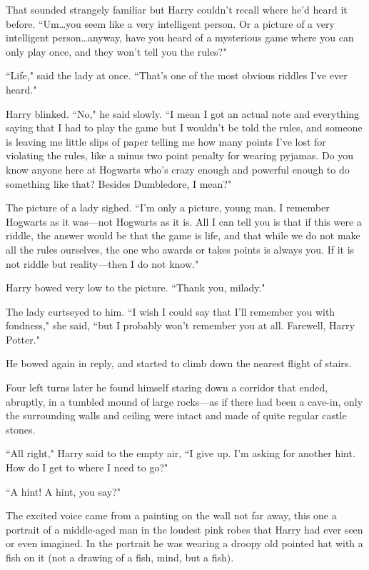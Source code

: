 That sounded strangely familiar but Harry couldn't recall where he'd heard it before. ``Um…you seem like a very intelligent person. Or a picture of a very intelligent person…anyway, have you heard of a mysterious game where you can only play once, and they won't tell you the rules?"

``Life," said the lady at once. ``That's one of the most obvious riddles I've ever heard."

Harry blinked. ``No," he said slowly. ``I mean I got an actual note and everything saying that I had to play the game but I wouldn't be told the rules, and someone is leaving me little slips of paper telling me how many points I've lost for violating the rules, like a minus two point penalty for wearing pyjamas. Do you know anyone here at Hogwarts who's crazy enough and powerful enough to do something like that? Besides Dumbledore, I mean?"

The picture of a lady sighed. ``I'm only a picture, young man. I remember Hogwarts as it was—not Hogwarts as it is. All I can tell you is that if this were a riddle, the answer would be that the game is life, and that while we do not make all the rules ourselves, the one who awards or takes points is always you. If it is not riddle but reality—then I do not know."

Harry bowed very low to the picture. ``Thank you, milady."

The lady curtseyed to him. ``I wish I could say that I'll remember you with fondness," she said, ``but I probably won't remember you at all. Farewell, Harry Potter."

He bowed again in reply, and started to climb down the nearest flight of stairs.

Four left turns later he found himself staring down a corridor that ended, abruptly, in a tumbled mound of large rocks—as if there had been a cave-in, only the surrounding walls and ceiling were intact and made of quite regular castle stones.

``All right," Harry said to the empty air, ``I give up. I'm asking for another hint. How do I get to where I need to go?"

``A hint! A hint, you say?"

The excited voice came from a painting on the wall not far away, this one a portrait of a middle-aged man in the loudest pink robes that Harry had ever seen or even imagined. In the portrait he was wearing a droopy old pointed hat with a fish on it (not a drawing of a fish, mind, but a fish).

